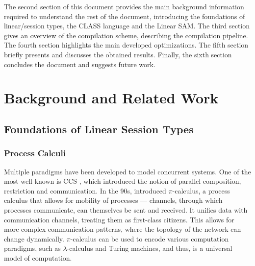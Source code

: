 \documentclass[sigconf,nonacm,natbib=true]{acmart}
\begin{document}
The second section of this document provides the main background information required to understand the rest of the document, introducing the foundations of linear/session types, the \ac{CLASS} language and the Linear \ac{SAM}. The third section gives an overview of the compilation scheme, describing the compilation pipeline. The fourth section highlights the main developed optimizations. The fifth section briefly presents and discusses the obtained results. Finally, the sixth section concludes the document and suggests future work.

\section{Background and Related Work}

\subsection{Foundations of Linear Session Types}

\subsubsection{Process Calculi}

Multiple paradigms have been developed to model concurrent systems. One of the most well-known is \acf{CCS} \citep{Milner:1980}, which introduced the notion of parallel composition, restriction and communication. In the 90s, \citet{Milner:1992:1,Milner:1992:2} introduced $\pi$-calculus, a process calculus that allows for mobility of processes --- channels, through which processes communicate, can themselves be sent and received. It unifies data with communication channels, treating them as first-class citizens. This allows for more complex communication patterns, where the topology of the network can change dynamically. $\pi$-calculus can be used to encode various computation paradigms, such as $\lambda$-calculus and Turing machines, and thus, is a universal model of computation.

\end{document}
